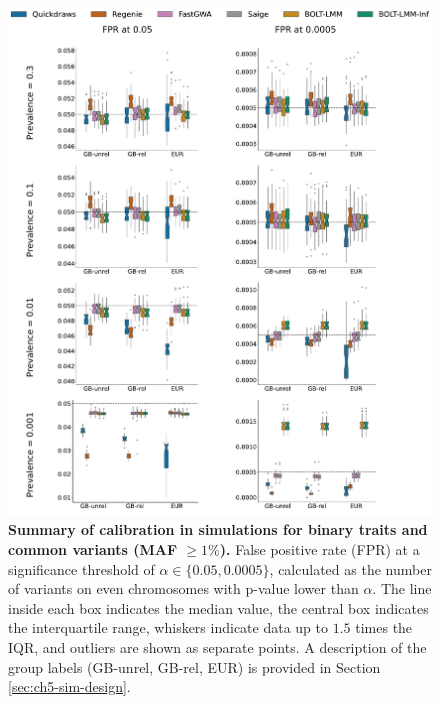 \begin{figure}[h!]
    \centering
    \includegraphics[width=\textwidth]{figures/sim_calibration/bt_fpr_common.pdf}
    \caption{\textbf{Summary of calibration in simulations for binary traits and common variants (MAF $\geq 1\%$).}
    False positive rate (FPR) at a significance threshold of $\alpha \in \{0.05, 0.0005\}$, calculated as the number of variants on even chromosomes with p-value lower than $\alpha$.
    The line inside each box indicates the median value, the central box indicates the interquartile range, whiskers indicate data up to $1.5$ times the IQR, and outliers are shown as separate points.
    A description of the group labels (GB-unrel, GB-rel, EUR) is provided in Section \ref{sec:ch5-sim-design}.
    \label{fig:qd_sim_fpr_bt1}
    }
\end{figure}

